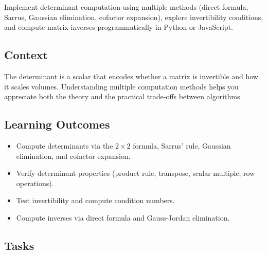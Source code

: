 \documentclass[a4paper,11pt]{article}
\begin{document}
Implement determinant computation using multiple methods (direct formula, Sarrus, Gaussian elimination, cofactor expansion), explore invertibility conditions, and compute matrix inverses programmatically in Python or JavaScript.

\subsection{Context}

The determinant is a scalar that encodes whether a matrix is invertible and how it scales volumes. Understanding multiple computation methods helps you appreciate both the theory and the practical trade-offs between algorithms.

\subsection{Learning Outcomes}

\begin{itemize}[leftmargin=*]
  \item Compute determinants via the $2 \times 2$ formula, Sarrus' rule, Gaussian elimination, and cofactor expansion.
  \item Verify determinant properties (product rule, transpose, scalar multiple, row operations).
  \item Test invertibility and compute condition numbers.
  \item Compute inverses via direct formula and Gauss-Jordan elimination.
\end{itemize}

\subsection{Tasks}
\end{document}
